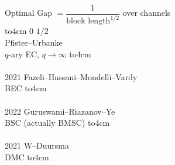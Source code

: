 \documentclass[12pt, aspectratio=169]{beamer}
\begin{document}
\begin{frame}
    \fontsize{20pt}{0}\selectfont
    Optimal Gap $= \dfrac1{\text{block length}^{1/2}}$ over channels  \\
    \fontsize{16pt}{16pt}\selectfont
    \raggedleft {}
    \pause           \hfill\hbox to4cm{\color{teal} $0$ \hfill $1/2$} \\
     Pfister--Urbanke                                \\
    $q$-ary EC, $q → ∞$                                 \hbox to4cm{} \\
    \pause                                                          ~ \\
	2021 Fazeli--Hassani--Mondelli--Vardy                \\
    BEC                                                 \hbox to4cm{} \\
    \pause                                                          ~ \\
	2022 Guruswami--Riazanov--Ye                         \\
    BSC (actually BMSC)                                 \hbox to4cm{} \\
    \pause                                                          ~ \\
	2021 W--Duursma                                      \\
    DMC                                                 \hbox to4cm{} \\
\end{frame}
\end{document}
